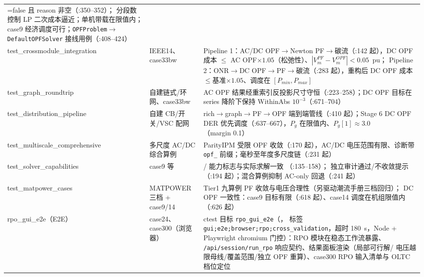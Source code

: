\begin{footnotesize}
\begin{longtable}{@{}L{4.2cm}L{3.6cm}L{6.6cm}@{}}
  =false 且 reason 非空（:350--352）；
   分段数控制 LP 二次成本逼近；单机带载在限值内；
  case9 经济调度可行；\texttt{OPFProblem}$\to$\texttt{DefaultOPFSolver}
  接线用例（:408--424）\\
test\_crossmodule\_integration & IEEE14、case33bw &
  Pipeline 1：AC/DC OPF$\to$Newton PF$\to$碳流（:142 起），DC OPF 成本
  $\le$ AC OPF$\times1.05$（松弛性）、$|V_m^{PF}-V_m^{OPF}|<0.05$~pu；
  Pipeline 2：ONR$\to$DC OPF$\to$PF$\to$碳流（:283 起），重构后 DC OPF 成本
  $\le$基准$\times1.05$、调度在 $[P_{min},P_{max}]$\\
test\_graph\_roundtrip & 自建链式/环网、case33bw &
  AC OPF 结果经重索引反投影尺寸守恒（:223--258）；DC OPF 目标在 series
  降阶下保持 WithinAbs $10^{-3}$（:671--704）\\
test\_distribution\_pipeline & 自建 CB/开关/VSC 配网 &
  rich$\to$graph$\to$PF$\to$OPF 端到端管线（:410 起）；Stage 6 DC OPF
  DER 优先调度（:637--667），$P_g$ 在限值内、$P_g[1]\approx3.0$
  （margin 0.1）\\
test\_multiscale\_comprehensive & 多尺度 AC/DC 综合算例 &
  ParityIPM 受限 OPF 收敛（:170 起），AC/DC 电压范围有限、诊断带
  \texttt{opf\_} 前缀；毫秒至年度多尺度链（:231 起）\\
test\_solver\_capabilities & case9 等 &
  / 能力标志与实际求解一致
  （:135--158）； 独立审计通过/不收敛提示
  （:194 起）；混合算例抑制 AC-only 回退（:241 起）\\
test\_matpower\_cases & MATPOWER 三档 + case9/14 &
  Tier1 九算例 PF 收敛与电压合理性（另驱动潮流手册三档回归）；
  DC OPF 一致性：case9 目标有限（:618 起）、case14 调度在机组限值内
  （:626 起）\\
rpo\_gui\_e2e（E2E） & case24、case300（浏览器） &
  ctest 目标 \texttt{rpo\_gui\_e2e}（，
  标签 \texttt{gui;e2e;browser;rpo;cross\_validation}，超时 180~s，Node +
  Playwright chromium 门控）：RPO 模块在稳态工作流暴露、
  \texttt{/api/session/run\_rpo} 响应契约、结果面板渲染（局部可行解/
  电压越限母线/覆盖范围/独立 OPF 重算）、case300 RPO 输入清单与 OLTC
  档位定位\\
\bottomrule
\end{longtable}
\end{footnotesize}

